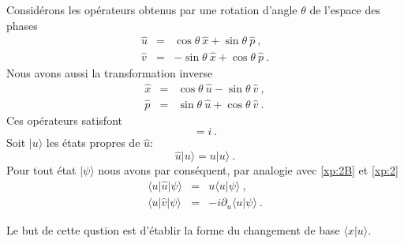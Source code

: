 Considérons les opérateurs obtenus par une rotation d'angle $\theta$ de l'espace des phases
\begin{eqnarray}
\hat u  &=&  \cos \theta\  \hat x + \sin \theta\   \hat p\ ,
\label{xp:5}\\
\hat v  &=&  - \sin \theta \  \hat x + \cos \theta \  \hat p \label{xp:6}\ .
\end{eqnarray}
Nous avons aussi la transformation inverse
\begin{eqnarray}
\hat x  &=&  \cos \theta\   \hat u - \sin \theta\   \hat v\ ,
\label{xp:7}\\
\hat p  &=&   \sin \theta\   \hat u + \cos \theta\   \hat v \label{xp:8}\ .
\end{eqnarray}
Ces opérateurs satisfont 
\begin{equation}
[\hat u, \hat v ] = i\ .
\label{xp:9}
\end{equation}
Soit $\vert u \rangle$ les états propres de $\hat u$:
\begin{equation}
\hat u \vert u \rangle = u \vert u \rangle \ .
\label{xp:10}
\end{equation}
Pour tout état $\vert \psi \rangle$ nous avons par conséquent, par analogie avec \eqref{xp:2B} et \eqref{xp:2} 
\begin{eqnarray}
\langle u \vert \hat u \vert \psi \rangle &=& u  \langle u  \vert \psi \rangle \ ,
\label{xp:3}\\
\langle u \vert \hat v \vert \psi \rangle &=& -i \partial_u  \langle u  \vert \psi \rangle\ . \label{xp:4}
\end{eqnarray}

Le but de cette qustion est d'établir la forme du changement de base $\langle x \vert u \rangle$.

